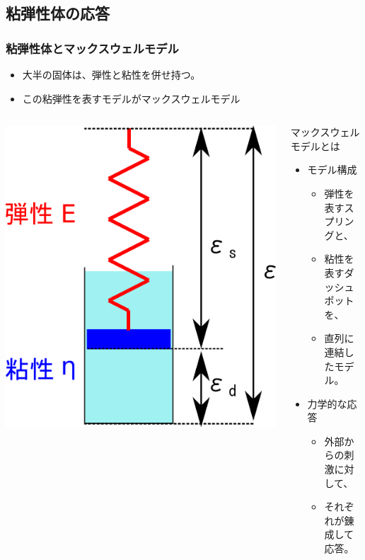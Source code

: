 \documentclass[unicode,12pt]{beamer}%
\begin{document}
\subsection{粘弾性体の応答}
\begin{frame}
	\frametitle{粘弾性体とマックスウェルモデル}
	\begin{itemize}
		\item 大半の固体は、弾性と粘性を併せ持つ。
		\item この粘弾性を表すモデルがマックスウェルモデル
	\end{itemize}
	\begin{columns}[c, onlytextwidth]
		\centering
		\includegraphics[width=.9\textwidth]{Maxwell_model.png}
		\begin{block}{マックスウェルモデルとは}
			\begin{itemize}
				\item モデル構成
				\begin{itemize}
					\item 弾性を表すスプリングと、
					\item 粘性を表すダッシュポットを、
					\item 直列に連結したモデル。
				\end{itemize}
				\item 力学的な応答
				\begin{itemize}
					\item 外部からの刺激に対して、
					\item それぞれが錬成して応答。
				\end{itemize}
			\end{itemize}
			
		\end{block}
	\end{columns}
\end{frame}
\end{document}
